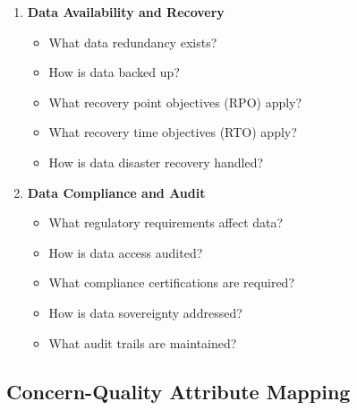 \documentclass[11pt,letterpaper]{article}
\begin{document}
\begin{enumerate}[label=\textbf{C\arabic*:}, leftmargin=2.5em]
    \item \textbf{Data Availability and Recovery}
    \begin{itemize}[nosep]
        \item What data redundancy exists?
        \item How is data backed up?
        \item What recovery point objectives (RPO) apply?
        \item What recovery time objectives (RTO) apply?
        \item How is data disaster recovery handled?
    \end{itemize}
    
    \item \textbf{Data Compliance and Audit}
    \begin{itemize}[nosep]
        \item What regulatory requirements affect data?
        \item How is data access audited?
        \item What compliance certifications are required?
        \item How is data sovereignty addressed?
        \item What audit trails are maintained?
    \end{itemize}
\end{enumerate}

\subsection{Concern-Quality Attribute Mapping}
\end{document}
